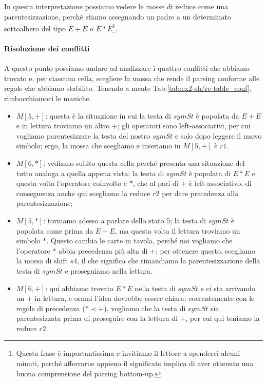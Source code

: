 \documentclass[class=book, crop=false, oneside, 12pt]{standalone}
\begin{document}
In questa interpretazione possiamo vedere le mosse di reduce come una parentesizzazione, perché stiamo assegnando un padre a un determinato sottoalbero del tipo \(E + E\) o \(E * E\)\footnote{Questa frase è importantissima e invitiamo il lettore a spenderci alcuni minuti, perché afferrarne appieno il significato implica di aver ottenuto una buona comprensione del parsing bottom-up.}.

\paragraph{Risoluzione dei conflitti}
A questo punto possiamo andare ad analizzare i quattro conflitti che abbiamo trovato e, per ciascuna cella, scegliere la mossa che rende il parsing conforme alle regole che abbiamo stabilito. Tenendo a mente Tab.\ref{tab:ex2-sh/re-table_conf}, rimbocchiamoci le maniche.
\begin{itemize}
    \item \(M[5, +]\): questa è la situazione in cui la testa di \(symSt\) è popolata da \(E + E\) e in lettura troviamo un altro \(+\); gli operatori sono left-associativi, per cui vogliamo parentesizzare la testa del nostro \(symSt\) e solo dopo leggere il nuovo simbolo; ergo, la mossa che scegliamo e inseriamo in \(M[5, +]\) è \(r1\).
    \item \(M[6, *]\): vediamo subito questa cella perché presenta una situazione del tutto analoga a quella appena vista;  la testa di \(symSt\) è popolata di \(E * E\) e questa volta l'operatore coinvolto è \(\ast\), che al pari di \(+\) è left-associativo, di conseguenza anche qui scegliamo la reduce \(r2\) per dare precedenza alla parentesizzazione;
    \item \(M[5, *]\): torniamo adesso a parlare dello stato 5; la testa di \(symSt\) è popolata come prima da \(E + E\), ma questa volta il lettura troviamo un simbolo \(\ast\). Questo cambia le carte in tavola, perché noi vogliamo che l'operatore \(\ast\) abbia precedenza più alta di \(+\); per ottenere questo, scegliamo la mossa di shift \(s4\), il che significa che rimandiamo la parentesizzazione della testa di \(symSt\) e proseguiamo nella lettura.
    \item \(M[6, +]\): qui abbiamo trovato \(E * E\) nella testa di \(symSt\) e ci sta arrivando un \(+\) in lettura, e ormai l'idea dovrebbe essere chiara: coerentemente con le regole di precedenza (\(\ast \prec +\)), vogliamo che la testa di \(symSt\) sia parentesizzata prima di proseguire con la lettura di \(+\), per cui qui teniamo la reduce \(r2\).
\end{itemize}
\end{document}
